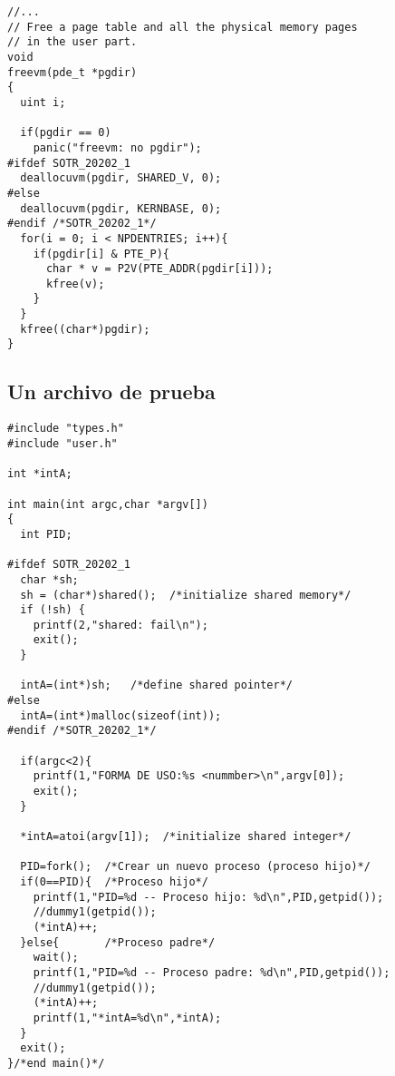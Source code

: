 \documentclass[12pt]{article}
\begin{document}
\begin{verbatim}
//...
// Free a page table and all the physical memory pages
// in the user part.
void
freevm(pde_t *pgdir)
{
  uint i;

  if(pgdir == 0)
    panic("freevm: no pgdir");
#ifdef SOTR_20202_1
  deallocuvm(pgdir, SHARED_V, 0);
#else
  deallocuvm(pgdir, KERNBASE, 0);
#endif /*SOTR_20202_1*/
  for(i = 0; i < NPDENTRIES; i++){
    if(pgdir[i] & PTE_P){
      char * v = P2V(PTE_ADDR(pgdir[i]));
      kfree(v);
    }
  }
  kfree((char*)pgdir);
}
\end{verbatim}
\subsection{Un archivo de prueba}
\begin{verbatim}
#include "types.h"
#include "user.h"

int *intA;

int main(int argc,char *argv[])
{
  int PID;

#ifdef SOTR_20202_1
  char *sh;
  sh = (char*)shared();  /*initialize shared memory*/
  if (!sh) {
    printf(2,"shared: fail\n");
    exit();
  }
  
  intA=(int*)sh;   /*define shared pointer*/
#else
  intA=(int*)malloc(sizeof(int));
#endif /*SOTR_20202_1*/

  if(argc<2){
    printf(1,"FORMA DE USO:%s <nummber>\n",argv[0]);
    exit();
  }

  *intA=atoi(argv[1]);  /*initialize shared integer*/

  PID=fork();  /*Crear un nuevo proceso (proceso hijo)*/
  if(0==PID){  /*Proceso hijo*/
    printf(1,"PID=%d -- Proceso hijo: %d\n",PID,getpid());
    //dummy1(getpid());
    (*intA)++;
  }else{       /*Proceso padre*/
    wait();
    printf(1,"PID=%d -- Proceso padre: %d\n",PID,getpid());
    //dummy1(getpid());
    (*intA)++;
    printf(1,"*intA=%d\n",*intA);
  }
  exit();
}/*end main()*/
\end{verbatim}
\end{document}
